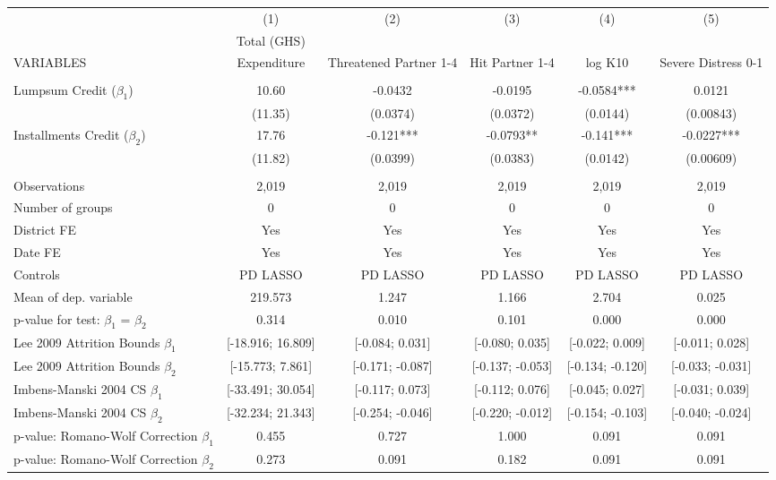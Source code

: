 \begin{tabular}{lccccc} \hline
 & (1) & (2) & (3) & (4) & (5) \\
 & Total (GHS) &  &  &  &  \\
VARIABLES & Expenditure & Threatened Partner 1-4 & Hit Partner 1-4 & log K10 & Severe Distress 0-1 \\ \hline
 &  &  &  &  &  \\
Lumpsum Credit ($\beta_1$) & 10.60 & -0.0432 & -0.0195 & -0.0584*** & 0.0121 \\
 & (11.35) & (0.0374) & (0.0372) & (0.0144) & (0.00843) \\
Installments Credit ($\beta_2$) & 17.76 & -0.121*** & -0.0793** & -0.141*** & -0.0227*** \\
 & (11.82) & (0.0399) & (0.0383) & (0.0142) & (0.00609) \\
 &  &  &  &  &  \\
Observations & 2,019 & 2,019 & 2,019 & 2,019 & 2,019 \\
Number of groups & 0 & 0 & 0 & 0 & 0 \\
District FE & Yes & Yes & Yes & Yes & Yes \\
Date FE & Yes & Yes & Yes & Yes & Yes \\
Controls & PD LASSO & PD LASSO & PD LASSO & PD LASSO & PD LASSO \\
Mean of dep. variable & 219.573 & 1.247 & 1.166 & 2.704 & 0.025 \\
p-value for test: $\beta_1$ = $\beta_2$ & 0.314 & 0.010 & 0.101 & 0.000 & 0.000 \\
Lee 2009 Attrition Bounds $\beta_1$ & [-18.916; 16.809] & [-0.084; 0.031] & [-0.080; 0.035] & [-0.022; 0.009] & [-0.011; 0.028] \\
Lee 2009 Attrition Bounds $\beta_2$ & [-15.773; 7.861] & [-0.171; -0.087] & [-0.137; -0.053] & [-0.134; -0.120] & [-0.033; -0.031] \\
Imbens-Manski 2004 CS $\beta_1$ & [-33.491; 30.054] & [-0.117; 0.073] & [-0.112; 0.076] & [-0.045; 0.027] & [-0.031; 0.039] \\
Imbens-Manski 2004 CS $\beta_2$ & [-32.234; 21.343] & [-0.254; -0.046] & [-0.220; -0.012] & [-0.154; -0.103] & [-0.040; -0.024] \\
p-value: Romano-Wolf Correction $\beta_1$ & 0.455 & 0.727 & 1.000 & 0.091 & 0.091 \\
 p-value: Romano-Wolf Correction $\beta_2$ & 0.273 & 0.091 & 0.182 & 0.091 & 0.091 \\ \hline
\end{tabular}
